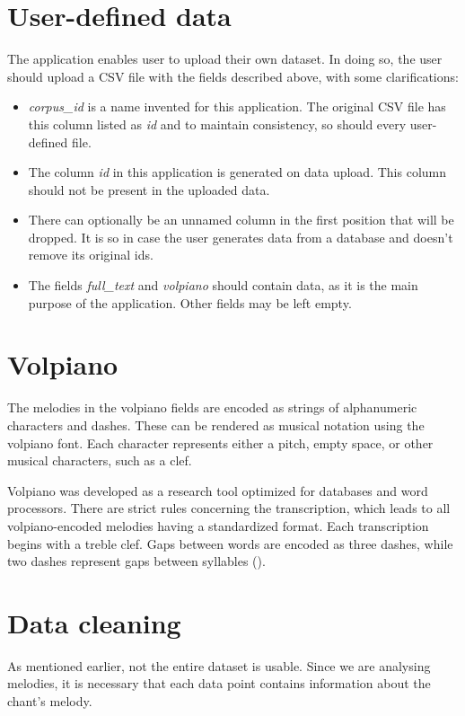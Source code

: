 \section{User-defined data}

The application enables user to upload their own dataset. In doing so, the user should upload a CSV file with the fields described above, with
some clarifications:

\begin{itemize}
    \item \emph{corpus\_id} is a name invented for this application. The original CSV file has this column listed as \emph{id} and
        to maintain consistency, so should every user-defined file.
    \item The column \emph{id} in this application is generated on data upload. This column should not be present in the uploaded
        data.
    \item There can optionally be an unnamed column in the first position that will be dropped. It is so in case the user generates
        data from a database and doesn't remove its original ids.
    \item The fields \emph{full\_text} and \emph{volpiano} should contain data, as it is the main purpose of the application. Other
        fields may be left empty.
\end{itemize}

\section{Volpiano}

The melodies in the volpiano fields are encoded as strings of alphanumeric characters and dashes. These can be rendered as musical notation using
the volpiano font. Each character represents either a pitch, empty space, or other musical characters, such as a clef.

Volpiano was developed as a research tool optimized for databases and word processors. There are strict rules concerning the transcription, which leads
to all volpiano-encoded melodies having a standardized format. Each transcription begins with a treble clef. Gaps between words are encoded as three
dashes, while two dashes represent gaps between syllables (\cite{volpiano}).

\section{Data cleaning}

As mentioned earlier, not the entire dataset is usable. Since we are analysing melodies, it is necessary that each data point contains information
about the chant's melody.

